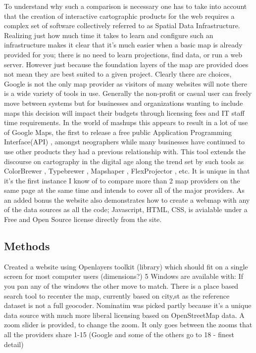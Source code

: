 \documentclass[12pt,letterpaper]{article}
\begin{document}
	To understand why such a comparison is necessary one has to take into account that the creation of interactive cartographic products for the web requires a complex set of software collectively referred to as Spatial Data Infrastructure. Realizing just how much time it takes to learn and configure such an infrastructure makes it clear that it's much easier when a basic map is already provided for you; there is no need to learn projections, find data, or run a web server. However just because the foundation layers of the map are provided does not mean they are best suited to a given project. Clearly there are choices, Google is not the only map provider as visitors of many websites will note there is a wide variety of tools in use. Generally the non-profit or casual user can freely move between systems but for businesses and organizations wanting to include maps this decision will impact their budgets through  licensing fees and IT staff time requirements. In the world of mashups this appears to result in a lot of use of Google Maps, the first to release a free public Application Programming Interface(API) \parencite{Turner2006}, amongst neographers while many businesses have continued to use other products they had a previous relationship with.
	  This tool extends the discourse on cartography in the digital age along the trend set by such tools as ColorBrewer \parencite{Harrower2003}, Typebrewer \parencite{Sheesley2008}, Mapshaper \parencite{Bloch2006}, FlexProjector \parencite{Jenny2010} , etc. It is unique in that it's the first instance I know of to compare more than 2 map providers on the same page at the same time and intends to cover all of the major providers. As an added bonus the website also demonstrates how to create a webmap with any of the data sources as all the code; Javascript, HTML, CSS, is avialable under a Free and Open Source license directly from the site.
	





\subsection{Methods}
Created a website using Openlayers toolkit (library) which should fit on a single screen for most computer users (dimensions?)
5 Windows are available with:
If you pan any of the windows the other move to match.
There is a place based search tool to recenter the map, currently based on city,st as the reference dataset is not a full geocoder. Nominatim was picked partly because it's a unique data source with much more liberal licensing based on OpenStreetMap data.
A zoom slider is provided, to change the zoom. It only goes between the zooms that all the providers share 1-15 (Google and some of the others go to 18 - finest detail)
\end{document}
